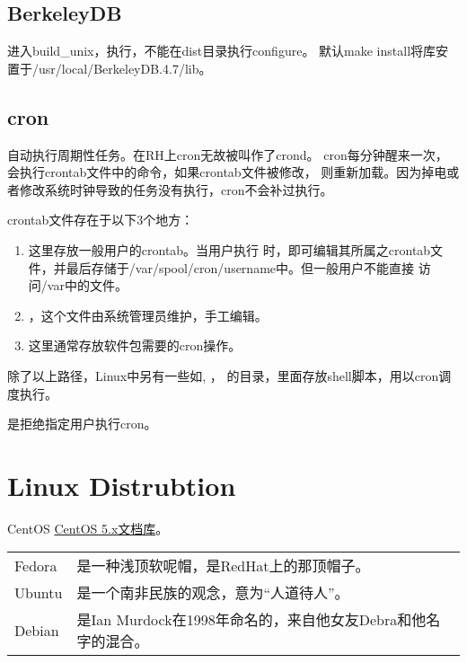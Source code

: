 \section{BerkeleyDB}
进入build\_unix，执行，不能在dist目录执行configure。
默认make install将库安置于/usr/local/BerkeleyDB.4.7/lib。

\section{cron}
自动执行周期性任务。在RH上cron无故被叫作了crond。
cron每分钟醒来一次，会执行crontab文件中的命令，如果crontab文件被修改，
则重新加载。因为掉电或者修改系统时钟导致的任务没有执行，cron不会补过执行。

crontab文件存在于以下3个地方：
\begin{enumerate}
\item {}这里存放一般用户的crontab。当用户执行
时，即可编辑其所属之crontab文件，并最后存储于/var/spool/cron/username中。但一般用户不能直接
访问/var中的文件。
\item {}，这个文件由系统管理员维护，手工编辑。
\item {}这里通常存放软件包需要的cron操作。
\end{enumerate}

除了以上路径，Linux中另有一些如, ，
的目录，里面存放shell脚本，用以cron调度执行。

是拒绝指定用户执行cron。

\chapter{Linux Distrubtion}
CentOS \href{http://www.centos.org/docs/5/}{CentOS 5.x文档库}。

\begin{tabular}{ll}
Fedora  & 是一种浅顶软呢帽，是RedHat上的那顶帽子。\\
Ubuntu  & 是一个南非民族的观念，意为“人道待人”。\\
Debian  & 是Ian Murdock在1998年命名的，来自他女友Debra和他名字的混合。\\
\end{tabular}

